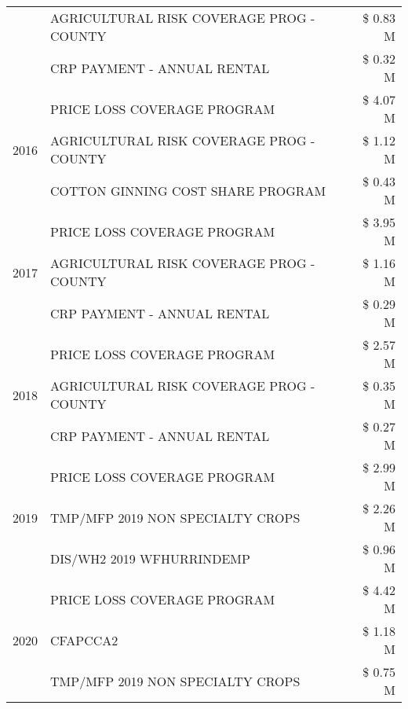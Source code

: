 \begin{tabular}{llr}
 & AGRICULTURAL RISK COVERAGE PROG - COUNTY & \$ 0.83 M \\
 & CRP PAYMENT - ANNUAL RENTAL & \$ 0.32 M \\
\cline{1-3}
\multirow[t]{3}{*}{2016} & PRICE LOSS COVERAGE PROGRAM                   & \$ 4.07 M \\
 & AGRICULTURAL RISK COVERAGE PROG - COUNTY      & \$ 1.12 M \\
 & COTTON GINNING COST SHARE PROGRAM             & \$ 0.43 M \\
\cline{1-3}
\multirow[t]{3}{*}{2017} & PRICE LOSS COVERAGE PROGRAM & \$ 3.95 M \\
 & AGRICULTURAL RISK COVERAGE PROG - COUNTY & \$ 1.16 M \\
 & CRP PAYMENT - ANNUAL RENTAL & \$ 0.29 M \\
\cline{1-3}
\multirow[t]{3}{*}{2018} & PRICE LOSS COVERAGE PROGRAM & \$ 2.57 M \\
 & AGRICULTURAL RISK COVERAGE PROG - COUNTY & \$ 0.35 M \\
 & CRP PAYMENT - ANNUAL RENTAL & \$ 0.27 M \\
\cline{1-3}
\multirow[t]{3}{*}{2019} & PRICE LOSS COVERAGE PROGRAM & \$ 2.99 M \\
 & TMP/MFP 2019 NON SPECIALTY CROPS & \$ 2.26 M \\
 & DIS/WH2 2019 WFHURRINDEMP & \$ 0.96 M \\
\cline{1-3}
\multirow[t]{3}{*}{2020} & PRICE LOSS COVERAGE PROGRAM & \$ 4.42 M \\
 & CFAPCCA2 & \$ 1.18 M \\
 & TMP/MFP 2019 NON SPECIALTY CROPS & \$ 0.75 M \\
\cline{1-3}
\bottomrule
\end{tabular}
